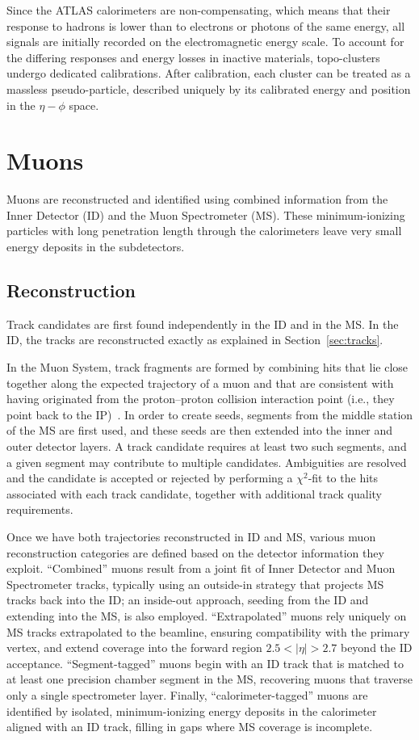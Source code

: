 Since the ATLAS calorimeters are non-compensating, which means that their response to hadrons is lower than to electrons or photons of the same energy, all signals are initially recorded on the electromagnetic energy scale. To account for the differing responses and energy losses in inactive materials, topo-clusters undergo dedicated calibrations. After calibration, each cluster can be treated as a massless pseudo-particle, described uniquely by its calibrated energy and position in the $\eta - \phi$ space.

\section{Muons}
\label{sec:muons}

Muons are reconstructed and identified using combined information from the Inner Detector (ID) and the Muon Spectrometer (MS). These minimum-ionizing particles with long penetration length through the calorimeters leave very small energy deposits in the subdetectors.
\subsection*{Reconstruction} 
Track candidates are first found independently in the ID and in the MS. In the ID, the tracks are reconstructed exactly as explained in Section~\ref{sec:tracks}.

In the Muon System, track fragments are formed by combining hits that lie close together along the expected trajectory of a muon and that are consistent with having originated from the proton–proton collision interaction point (i.e., they point back to the IP)~\cite{muon_reco_run2}. 
In order to create seeds, segments from the middle station of the MS are first used, and these seeds are then extended into the inner and outer detector layers. A track candidate requires at least two such segments, and a given segment may contribute to multiple candidates. Ambiguities are resolved and the candidate is accepted or rejected by performing a $\chi^2$-fit to the hits associated with each track candidate, together with additional track quality requirements.

Once we have both trajectories reconstructed in ID and MS, various muon reconstruction categories are defined based on the detector information they exploit. “Combined” muons result from a joint fit of Inner Detector and Muon Spectrometer tracks, typically using an outside-in strategy that projects MS tracks back into the ID; an inside-out approach, seeding from the ID and extending into the MS, is also employed. “Extrapolated” muons rely uniquely on MS tracks extrapolated to the beamline, ensuring compatibility with the primary vertex, and extend coverage into the forward region $2.5 \lt |\eta| \gt 2.7$
beyond the ID acceptance. “Segment-tagged” muons begin with an ID track that is matched to at least one precision chamber segment in the MS, recovering muons that traverse only a single spectrometer layer. Finally, “calorimeter-tagged” muons are identified by isolated, minimum-ionizing energy deposits in the calorimeter aligned with an ID track, filling in gaps where MS coverage is incomplete.

